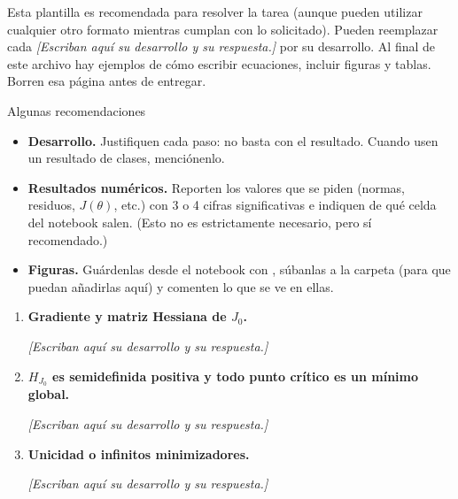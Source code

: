 \documentclass{article}
\newcommand\grupo{10}
\newcommand\pendiente{{\color{gris90}\itshape [Escriban aquí su desarrollo y su respuesta.]}}
\begin{document}
\portada[Grupo \grupo]


\begin{nota}[Indicaciones]
  Esta plantilla es recomendada para resolver la tarea (aunque pueden utilizar cualquier otro formato mientras cumplan con lo solicitado). 
  Pueden reemplazar cada \pendiente{} por su desarrollo.
  Al final de este archivo hay ejemplos de cómo escribir ecuaciones, incluir figuras y tablas. Borren esa página antes de entregar.
\end{nota}

Algunas recomendaciones
\begin{itemize}
  \item \textbf{Desarrollo.} Justifiquen cada paso: no basta con el resultado. Cuando usen un resultado de clases, menciónenlo.
  \item \textbf{Resultados numéricos.} Reporten los valores que se piden (normas, residuos, $J(\theta)$, etc.) con 3 o 4 cifras significativas e indiquen de qué celda del notebook salen. (Esto no es estrictamente necesario, pero sí recomendado.)
  \item \textbf{Figuras.} Guárdenlas desde el notebook con , súbanlas a la carpeta  (para que puedan añadirlas aquí) y comenten lo que se ve en ellas.
\end{itemize}
\despueslista



\begin{enumerate}[label=\roman*., widest=iii]
  \item \textbf{Gradiente y matriz Hessiana de $J_0$.}

  \pendiente

  \item \textbf{$H_{J_0}$ es semidefinida positiva y todo punto crítico es un mínimo global.}

  \pendiente

  \item \textbf{Unicidad o infinitos minimizadores.}

  \pendiente
\end{enumerate}
\despueslista
\end{document}
